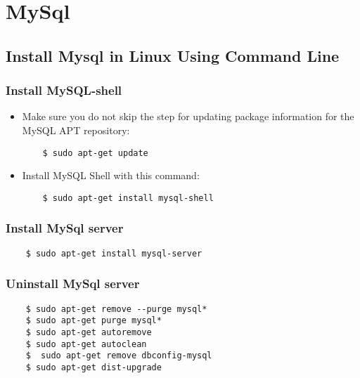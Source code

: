 \chapter{MySql}

\section{Install Mysql in Linux Using Command Line}	


\subsection{Install MySQL-shell}

\begin{itemize}
	
\item Make sure you do not skip the step for updating package information for the MySQL APT repository: 
	
	\begin{verbatim}
	$ sudo apt-get update
	\end{verbatim}
	
	\item Install MySQL Shell with this command: 
	
	\begin{verbatim}
	$ sudo apt-get install mysql-shell
	\end{verbatim}
\end{itemize}

\subsection{Install MySql server}

\begin{itemize}
	

	
	\begin{verbatim}
	$ sudo apt-get install mysql-server
	\end{verbatim}
	

\end{itemize}

\subsection{Uninstall MySql server}

\begin{itemize}
	
	
	
	\begin{verbatim}
	$ sudo apt-get remove --purge mysql*
	$ sudo apt-get purge mysql*
	$ sudo apt-get autoremove
	$ sudo apt-get autoclean
	$  sudo apt-get remove dbconfig-mysql
	$ sudo apt-get dist-upgrade
	\end{verbatim}
	
	
\end{itemize}

